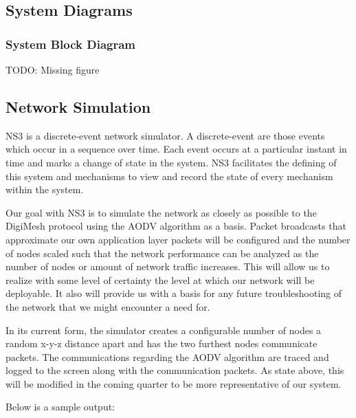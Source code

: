 \documentclass[journal]{IEEEtran}
\begin{document}
\subsection{System Diagrams}

\subsubsection{System Block Diagram}

TODO: Missing figure

\subsection{Network Simulation}

NS3 is a discrete-event network simulator. A discrete-event are those events which occur in a sequence over time. Each event occurs at a particular instant in time and marks a change of state in the system. NS3 facilitates the defining of this system and mechanisms to view and record the state of every mechanism within the system.

Our goal with NS3 is to simulate the network as closely as possible to the DigiMesh protocol using the AODV algorithm as a basis. Packet broadcasts that approximate our own application layer packets will be configured and the number of nodes scaled such that the network performance can be analyzed as the number of nodes or amount of network traffic increases. This will allow us to realize with some level of certainty the level at which our network will be deployable. It also will provide us with a basis for any future troubleshooting of the network that we might encounter a need for.

In its current form, the simulator creates a configurable number of nodes a random x-y-z distance apart and has the two furthest nodes communicate packets. The communications regarding the AODV algorithm are traced and logged to the screen along with the communication packets. As state above, this will be modified in the coming quarter to be more representative of our system.

Below is a sample output:
\end{document}
